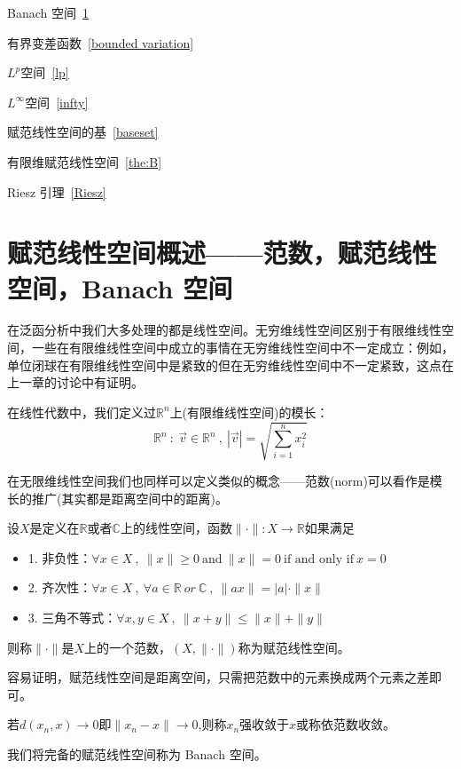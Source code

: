 \begin{introduction}
    \item Banach 空间~\ref{Banach}
    \item 有界变差函数~\ref{bounded variation}
    \item $L^p$空间~\ref{lp}
    \item $L^{\infty}$空间~\ref{infty}
    \item 赋范线性空间的基~\ref{baseset}
    \item 有限维赋范线性空间~\ref{the:B}
    \item Riesz 引理~\ref{Riesz}
  \end{introduction}
\section{赋范线性空间概述——范数，赋范线性空间，Banach 空间}\label{Banach}
在泛函分析中我们大多处理的都是线性空间。无穷维线性空间区别于有限维线性空间，一些在有限维线性空间中成立的事情在无穷维线性空间中不一定成立：例如，单位闭球在有限维线性空间中是紧致的但在无穷维线性空间中不一定紧致，这点在上一章的讨论中有证明。

在线性代数中，我们定义过$\mathbb{R}^n$上(有限维线性空间)的模长：
\[\mathbb{R}^n \ : \ \vec{v} \in \mathbb{R}^n \ , \ |\vec{v}|=\sqrt{\sum_{i=1}^nx_i^2}\]

在无限维线性空间我们也同样可以定义类似的概念——范数(norm)可以看作是模长的推广(其实都是距离空间中的距离)。
\begin{definition}[范数]
设$X$是定义在$\mathbb{R}$或者$\mathbb{C}$上的线性空间，函数$\| \cdot \|:X \to \mathbb{R}$如果满足
\begin{itemize}
    \item 1. 非负性：$\forall x \in X \ , \ \|x\| \geq 0 \ \text{and} \ \|x\|=0 \ \text{if and only if} \ x=0 \ $
    \item 2. 齐次性：$\forall x \in X \ , \ \forall a \in \mathbb{R} \ or \ \mathbb{C} \ , \ \|ax\|=|a|\cdot\|x\| \ $
    \item 3. 三角不等式：$\forall x,y \in X \ , \ \|x+y\| \leq \|x\|+\|y\| \ $
\end{itemize}
则称$\|\cdot\|$是$X$上的一个范数，$(X,\|\cdot\|)$称为赋范线性空间。
\end{definition}
容易证明，赋范线性空间是距离空间，只需把范数中的元素换成两个元素之差即可。
\begin{definition}
若$d(x_n,x) \to 0$即$\|x_n-x\| \to 0$,则称$x_n$强收敛于$x$或称依范数收敛。
\end{definition}
我们将完备的赋范线性空间称为 Banach 空间。

